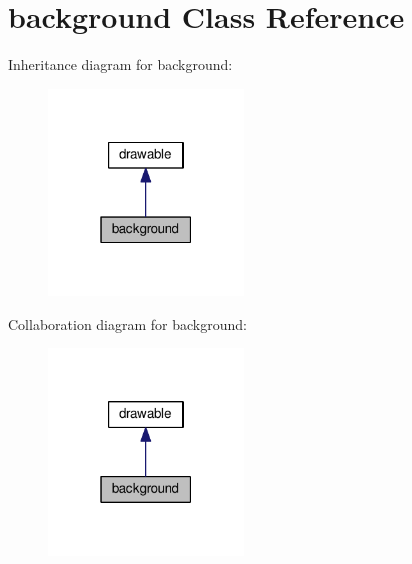 \hypertarget{classbackground}{}\section{background Class Reference}
\label{classbackground}


Inheritance diagram for background\+:\nopagebreak
\begin{figure}[H]
\begin{center}
\leavevmode
\includegraphics[width=147pt]{classbackground__inherit__graph}
\end{center}
\end{figure}


Collaboration diagram for background\+:\nopagebreak
\begin{figure}[H]
\begin{center}
\leavevmode
\includegraphics[width=147pt]{classbackground__coll__graph}
\end{center}
\end{figure}
